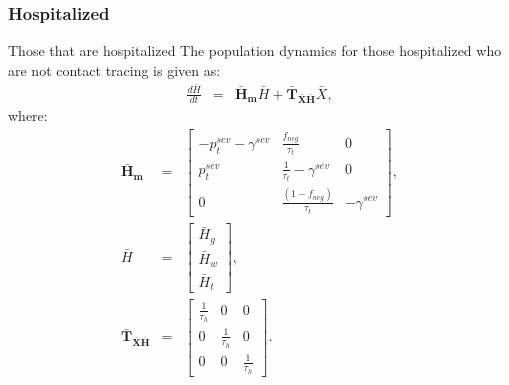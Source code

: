 \documentclass[notitlepage, superscriptaddress]{revtex4-2}
\begin{document}
\subsubsection{Hospitalized}
Those that are hospitalized 
The population dynamics for those hospitalized who are not contact tracing is given as:
\begin{eqnarray}
\frac{d\bar{H}}{dt} &=& \boldsymbol{\bar{H}_{m}}  \bar{H} + \boldsymbol{\bar{T}_{\bar{X}\bar{H}}}  \bar{X}, 
\end{eqnarray}
%
where:
\begin{eqnarray}
\boldsymbol{\bar{H}_{m}} &=&
\begin{bmatrix}
- p^{sev}_{t} - \gamma^{sev}  &  \frac{f_{neg}}{\tau_{t}}            & 0 \\ 
 p^{sev}_{t}              & \frac{1}{\tau_{t}} - \gamma^{sev}       & 0  \\ 
 0                  & \frac{(1- f_{neg})}{\tau_{t}}                        & -\gamma^{sev}
\end{bmatrix}, \\ 
%
\bar{H} &=& 
\begin{bmatrix}
\bar{H}_{g} \\ \bar{H}_{w}\\ \bar{H}_{t}
\end{bmatrix}, \\ 
%
\boldsymbol{\bar{T}_{\bar{X}\bar{H}}} &=&
\begin{bmatrix}
\frac{1}{\tau_{h}}  & 0                 & 0 \\ 
 0          &  \frac{1}{\tau_{h}}  & 0 \\ 
 0          & 0                 &  \frac{1}{\tau_{h}} 
\end{bmatrix}.
%
\end{eqnarray}
\end{document}

